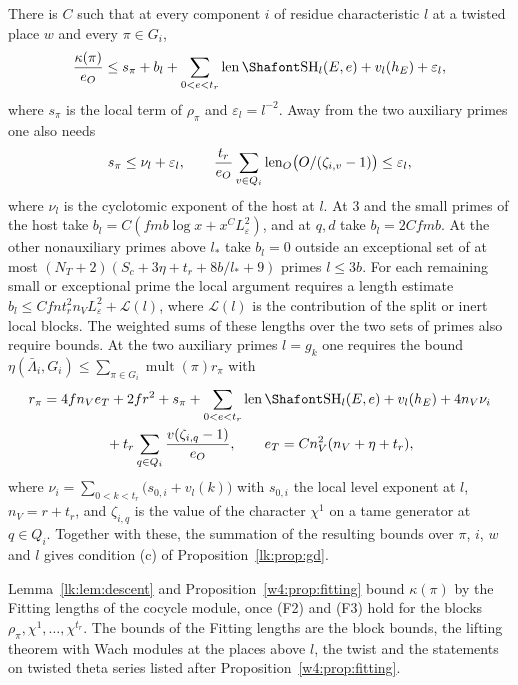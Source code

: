 \begin{hypothesis}\label{lk:hyp:block}
There is $C$ such that at every component $i$ of residue characteristic $l$ at a twisted place $w$ and every $\pi\in G_i$,
\[
\frac{\kappa(\pi)}{e_O}\le s_\pi+b_l+\sum_{0<e<t_r}\len\Sha_l(E,e)+v_l(h_E)+\varepsilon_l ,
\]
where $s_\pi$ is the local term of $\rho_\pi$ and $\varepsilon_l=l^{-2}$. Away from the two auxiliary primes one also needs
\[
 s_\pi\le\nu_l+\varepsilon_l,\qquad
 \frac{t_r}{e_O}\sum_{v\in Q_i}\operatorname{len}_O\bigl(O/(\zeta_{i,v}-1)\bigr)\le\varepsilon_l ,
\]
where $\nu_l$ is the cyclotomic exponent of the host at $l$. At $3$ and the small primes of the host take $b_l=C(fmb\log x+x^CL_\varepsilon^2)$, and at $q,d$ take $b_l=2Cfmb$. At the other nonauxiliary primes above $l_*$ take $b_l=0$ outside an exceptional set of at most $(N_T+2)(S_c+3\eta+t_r+8b/l_*+9)$ primes $l\le3b$. For each remaining small or exceptional prime the local argument requires a length estimate $b_l\le Cfn t_r^2n_VL_\varepsilon^2+\mathcal L(l)$, where $\mathcal L(l)$ is the contribution of the split or inert local blocks. The weighted sums of these lengths over the two sets of primes also require bounds. At the two auxiliary primes $l=g_k$ one requires the bound $\eta(\bar\Lambda_i,G_i)\le\sum_{\pi\in G_i}\operatorname{mult}(\pi)r_\pi$ with
\[
\begin{gathered}r_\pi=4fn_Ve_T+2fr^2+s_\pi+\sum_{0<e<t_r}\len\Sha_l(E,e)+v_l(h_E)+4n_V\nu_i\\ {}+t_r\sum_{q\in Q_i}\frac{v(\zeta_{i,q}-1)}{e_O},\qquad e_T=C n_V^2(n_V+\eta+t_r),\end{gathered}
\]
where $\nu_i=\sum_{0<k<t_r}\big(s_{0,i}+v_l(k)\big)$ with $s_{0,i}$ the local level exponent at $l$, $n_V=r+t_r$, and $\zeta_{i,q}$ is the value of the character $\chi^1$ on a tame generator at $q\in Q_i$. Together with these, the summation of the resulting bounds over $\pi$, $i$, $w$ and $l$ gives condition (c) of Proposition~\ref{lk:prop:gd}.
\end{hypothesis}

Lemma~\ref{lk:lem:descent} and Proposition~\ref{w4:prop:fitting} bound $\kappa(\pi)$ by the Fitting lengths of the cocycle module, once (F2) and (F3) hold for the blocks $\rho_\pi,\chi^1,\dots,\chi^{t_r}$. The bounds of the Fitting lengths are the block bounds, the lifting theorem with Wach modules at the places above $l$, the twist and the statements on twisted theta series listed after Proposition~\ref{w4:prop:fitting}. 

